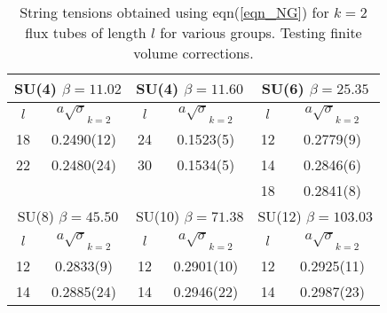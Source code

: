 \documentclass[12pt]{article}
\begin{document}
\begin{table}[htb]
\centering
\begin{tabular}{|cc|cc|cc|} \hline
  \multicolumn{2}{|c|}{SU(4) $\beta=11.02$} & \multicolumn{2}{|c|}{SU(4) $\beta=11.60$}
   & \multicolumn{2}{|c|}{SU(6) $\beta=25.35$} \\ \hline
  $l$ & $a\surd\sigma_{k=2}$ & $l$ & $a\surd\sigma_{k=2}$ & $l$ & $a\surd\sigma_{k=2}$ \\ \hline
 18  & 0.2490(12)  & 24  & 0.1523(5)  & 12  & 0.2779(9) \\
 22  & 0.2480(24)  & 30  & 0.1534(5)  & 14  & 0.2846(6) \\
     &             &     &            & 18  & 0.2841(8) \\  \hline
 \multicolumn{2}{|c|}{SU(8) $\beta=45.50$} & \multicolumn{2}{|c|}{SU(10) $\beta=71.38$} &
 \multicolumn{2}{|c|}{SU(12) $\beta=103.03$} \\ \hline
  $l$ & $a\surd\sigma_{k=2}$ & $l$ & $a\surd\sigma_{k=2}$ & $l$ & $a\surd\sigma_{k=2}$ \\ \hline
 12  & 0.2833(9)  & 12  & 0.2901(10)  & 12  & 0.2925(11)    \\
 14  & 0.2885(24) & 14  & 0.2946(22)  & 14  & 0.2987(23)    \\ \hline
\end{tabular}
\caption{String tensions obtained using eqn(\ref{eqn_NG})  for  $k=2$  flux tubes
  of length $l$ for various groups. Testing finite volume corrections.}
\label{table_V_k2_SUN}
\end{table}
\end{document}
